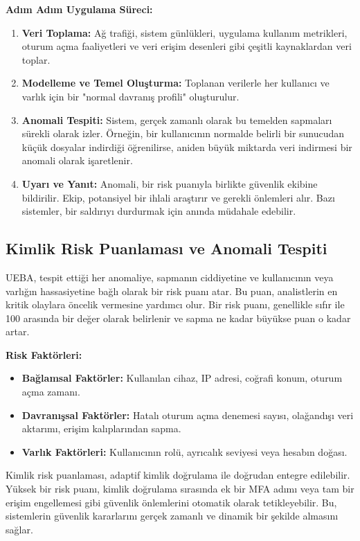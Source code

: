\textbf{Adım Adım Uygulama Süreci:}
\begin{enumerate}
    \item \textbf{Veri Toplama:} Ağ trafiği, sistem günlükleri, uygulama kullanım metrikleri, oturum açma faaliyetleri ve veri erişim desenleri gibi çeşitli kaynaklardan veri toplar.
    \item \textbf{Modelleme ve Temel Oluşturma:} Toplanan verilerle her kullanıcı ve varlık için bir "normal davranış profili" oluşturulur.
    \item \textbf{Anomali Tespiti:} Sistem, gerçek zamanlı olarak bu temelden sapmaları sürekli olarak izler. Örneğin, bir kullanıcının normalde belirli bir sunucudan küçük dosyalar indirdiği öğrenilirse, aniden büyük miktarda veri indirmesi bir anomali olarak işaretlenir.
    \item \textbf{Uyarı ve Yanıt:} Anomali, bir risk puanıyla birlikte güvenlik ekibine bildirilir. Ekip, potansiyel bir ihlali araştırır ve gerekli önlemleri alır. Bazı sistemler, bir saldırıyı durdurmak için anında müdahale edebilir.
\end{enumerate}

\subsection{Kimlik Risk Puanlaması ve Anomali Tespiti}

UEBA, tespit ettiği her anomaliye, sapmanın ciddiyetine ve kullanıcının veya varlığın hassasiyetine bağlı olarak bir risk puanı atar. Bu puan, analistlerin en kritik olaylara öncelik vermesine yardımcı olur. Bir risk puanı, genellikle sıfır ile 100 arasında bir değer olarak belirlenir ve sapma ne kadar büyükse puan o kadar artar.

\textbf{Risk Faktörleri:}
\begin{itemize}
    \item \textbf{Bağlamsal Faktörler:} Kullanılan cihaz, IP adresi, coğrafi konum, oturum açma zamanı.
    \item \textbf{Davranışsal Faktörler:} Hatalı oturum açma denemesi sayısı, olağandışı veri aktarımı, erişim kalıplarından sapma.
    \item \textbf{Varlık Faktörleri:} Kullanıcının rolü, ayrıcalık seviyesi veya hesabın doğası.
\end{itemize}

Kimlik risk puanlaması, adaptif kimlik doğrulama ile doğrudan entegre edilebilir. Yüksek bir risk puanı, kimlik doğrulama sırasında ek bir MFA adımı veya tam bir erişim engellemesi gibi güvenlik önlemlerini otomatik olarak tetikleyebilir. Bu, sistemlerin güvenlik kararlarını gerçek zamanlı ve dinamik bir şekilde almasını sağlar.


